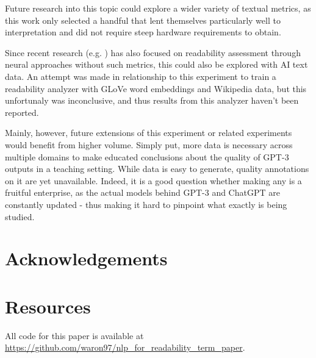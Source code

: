 \documentclass[11pt]{article}
\begin{document}
Future research into this topic could explore a wider variety of textual metrics, as this work only selected a handful that lent themselves particularly well to interpretation and did not require steep hardware requirements to obtain. 

Since recent research (e.g. \citealp{Deutsch_2020}) has also focused on readability assessment through neural approaches without such metrics, this could also be explored with AI text data. An attempt was made in relationship to this experiment to train a readability analyzer with GLoVe word embeddings \citep{pennington2014glove} and Wikipedia data, but this unfortunaly was inconclusive, and thus results from this analyzer haven't been reported.

Mainly, however, future extensions of this experiment or related experiments would benefit from higher volume. Simply put, more data is necessary across multiple domains to make educated conclusions about the quality of GPT-3 outputs in a teaching setting. While data is easy to generate, quality annotations on it are yet unavailable. Indeed, it is a good question whether making any is a fruitful enterprise, as the actual models behind GPT-3 and ChatGPT are constantly updated - thus making it hard to pinpoint what exactly is being studied.


\section*{Acknowledgements}




\appendix
\section*{Resources}

\label{sec:appendix}

All code for this paper is available at \url{https://github.com/waron97/nlp_for_readability_term_paper}.
\end{document}
